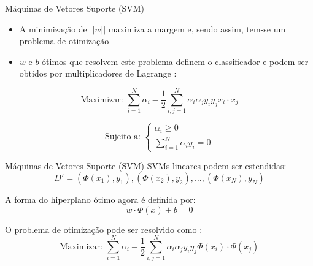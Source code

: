 \begin{frame}{Máquinas de Vetores Suporte (SVM)}
\begin{itemize}
    \item A minimização de $||w||$ maximiza a margem e, sendo assim, tem-se um problema de otimização
    \item $w$ e $b$ ótimos que resolvem este problema definem o classificador e podem ser obtidos por multiplicadores de Lagrange \citep{campbell:00}:
\end{itemize}
\begin{equation*}
\text{Maximizar: } \sum_{i=1}^N \alpha_i - \frac{1}{2} \sum_{i, j=1}^N \alpha_i \alpha_j y_i y_j x_i\cdot x_j
\end{equation*}

\begin{equation*}
\text{Sujeito a: }
\begin{cases}
    \alpha_i \geq 0\\[1em]
    \sum_{i=1}^N \alpha_i y_i = 0
\end{cases}
\end{equation*}

\end{frame}

\begin{frame}{Máquinas de Vetores Suporte (SVM)}
SVMs lineares podem ser estendidas:
\begin{equation*}
    D' = (\Phi(x_1), y_1), (\Phi(x_2), y_2), \ldots, (\Phi(x_N), y_N)
\end{equation*}

A forma do hiperplano ótimo agora é definida por:
\begin{equation*}
w \cdot \Phi(x) + b = 0
\end{equation*}

O problema de otimização pode ser resolvido como \citep{lorena:03}:
\begin{equation*}
\text{Maximizar: } \sum_{i=1}^N \alpha_i - \frac{1}{2} \sum_{i, j=1}^N \alpha_i \alpha_j y_i y_j \Phi(x_i)\cdot \Phi(x_j)
\end{equation*}

\end{frame}

